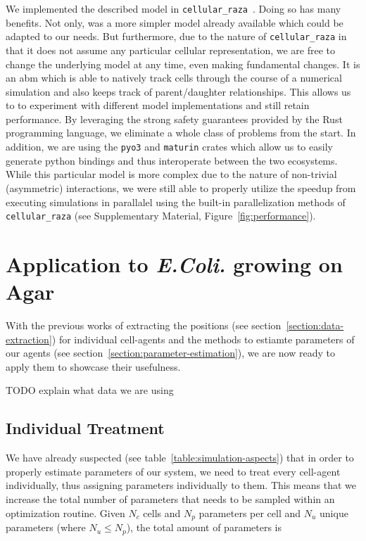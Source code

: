 \documentclass{article}
\begin{document}
We implemented the described model in \texttt{cellular\_raza}~\cite{Pleyer2025}.
Doing so has many benefits.
Not only, was a more simpler model already available which could be adapted to our needs.
But furthermore, due to the nature of \texttt{cellular\_raza} in that it does not assume any
particular cellular representation, we are free to change the underlying model at any time, even
making fundamental changes.
It is an \ac{abm} which is able to natively track cells through the course of a numerical simulation
and also keeps track of parent/daughter relationships.
This allows us to to experiment with different model implementations and still retain performance.
By leveraging the strong safety guarantees provided by the Rust programming language, we eliminate a
whole class of problems from the start.
In addition, we are using the \texttt{pyo3} and \texttt{maturin} crates which allow us to easily
generate python bindings and thus interoperate between the two ecosystems.
While this particular model is more complex due to the nature of non-trivial (asymmetric)
interactions, we were still able to properly utilize the speedup from executing simulations in
parallalel using the built-in parallelization methods of \texttt{cellular\_raza} (see
Supplementary Material, Figure~\ref{fig:performance}).

\section{Application to \textit{E.Coli.} growing on Agar}

With the previous works of extracting the positions (see section~\ref{section:data-extraction}) for
individual cell-agents and the methods to estiamte parameters of our agents (see section~\ref{section:parameter-estimation}), we are now ready to apply them to showcase their usefulness.

TODO explain what data we are using

\subsection{Individual Treatment}
We have already suspected (see table~\ref{table:simulation-aspects}) that in order to properly
estimate parameters of our system, we need to treat every cell-agent individually, thus assigning
parameters individually to them.
This means that we increase the total number of parameters that needs to be sampled within an
optimization routine.
Given $N_c$ cells and $N_p$ parameters per cell and $N_u$ unique parameters (where $N_u\leq N_p$),
the total amount of parameters is
\end{document}
